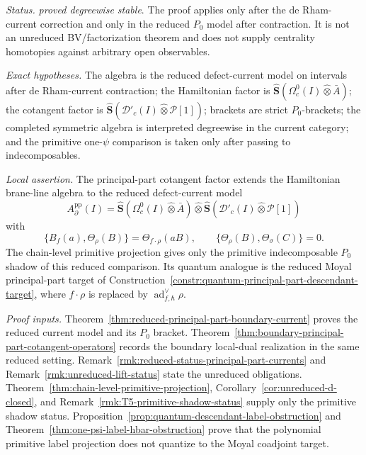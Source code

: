 \begin{stmt}\label{thm:lane-reduced-principal-part-current}
  \emph{Status.} \emph{proved degreewise stable}.  The proof applies
  only after the de Rham-current correction and only in the
  reduced \(P_0\) model after contraction.  It is not an unreduced
  BV/factorization theorem and does not supply centrality homotopies
  against arbitrary open observables.

  \emph{Exact hypotheses.} The algebra is the reduced
  defect-current model on intervals after de Rham-current contraction;
  the Hamiltonian factor is
  \(\widehat{\mathbf S}(\Omega_c^0(I)\widehat\otimes\bar A)\); the
  cotangent factor is
  \(\widehat{\mathbf S}(\mathcal D'_c(I)\widehat\otimes\mathcal P[1])\);
  brackets are strict \(P_0\)-brackets; the completed symmetric algebra
  is interpreted degreewise in the current category; and the primitive
  one-\(\psi\) comparison is taken only after passing to
  indecomposables.

  \emph{Local assertion.} The principal-part cotangent factor extends
  the Hamiltonian brane-line algebra to the reduced defect-current
  model
  \[
    A^{\mathrm{pp}}_\partial(I)
    =
    \widehat{\mathbf S}(\Omega_c^0(I)\widehat\otimes\bar A)
    \widehat\otimes
    \widehat{\mathbf S}(\mathcal D'_c(I)\widehat\otimes\mathcal P[1])
  \]
  with
  \[
    \{B_f(a),\Theta_\rho(B)\}
    =
    \Theta_{f\cdot\rho}(aB),
    \qquad
    \{\Theta_\rho(B),\Theta_\sigma(C)\}=0 .
  \]
  The chain-level primitive projection gives only the primitive
  indecomposable \(P_0\) shadow of this reduced comparison.
  Its quantum analogue is the reduced Moyal principal-part target of
  Construction~\ref{constr:quantum-principal-part-descendant-target},
  where \(f\cdot\rho\) is replaced by
  \(\operatorname{ad}^{\vee}_{f,\hbar}\rho\).

  \emph{Proof inputs.}
  Theorem~\ref{thm:reduced-principal-part-boundary-current} proves the
  reduced current model and its \(P_0\) bracket.  Theorem~\ref{thm:boundary-principal-part-cotangent-operators}
  records the boundary local-dual realization in the same reduced
  setting.  Remark~\ref{rmk:reduced-status-principal-part-currents} and
  Remark~\ref{rmk:unreduced-lift-status} state the unreduced
  obligations.  Theorem~\ref{thm:chain-level-primitive-projection},
  Corollary~\ref{cor:unreduced-d-closed}, and
  Remark~\ref{rmk:T5-primitive-shadow-status} supply only the primitive
  shadow status.  Proposition~\ref{prop:quantum-descendant-label-obstruction}
  and Theorem~\ref{thm:one-psi-label-hbar-obstruction} prove
  that the polynomial primitive label projection does not quantize to
  the Moyal coadjoint target.


\end{stmt}
